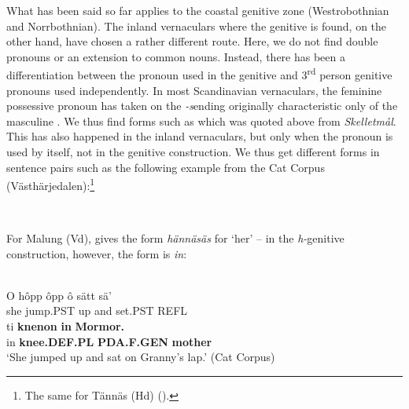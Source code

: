 What has been said so far applies to the coastal genitive zone (Westrobothnian and Norrbothnian). The inland vernaculars where the genitive is found, on the other hand, have chosen a rather different route. Here, we do not find double pronouns or an extension to common nouns. Instead, there has been a differentiation between the pronoun used in the genitive and 3\textsuperscript{rd} person genitive pronouns used independently. In most Scandinavian vernaculars, the feminine possessive pronoun has taken on the\textit{ {}-s}\textstyleLinguisticExample{ }ending originally characteristic only of the masculine . We thus find forms such as  which was quoted above from \textit{Skelletmål}. This has also happened in the inland vernaculars, but only when the pronoun is used by itself, not in the genitive construction. We thus get different forms in sentence pairs such as the following example from the Cat Corpus (Västhärjedalen):\footnote{ The same for Tännäs (Hd) (\citet[22]{Olofsson1999}).}

\ea\label{}
\\

\z 
\z

For Malung (Vd), \citet[2:211]{Levander1925} gives the form \textit{hännäsäs} for ‘her’ – in the \textit{h-}genitive construction, however, the form is \textit{in}: 


\ea\label{}
\\
\gll O  hôpp  ôpp  ô  sätt  sä’  \\
she  jump.PST  up  and  set.PST  REFL  \\
\gll ti  \textbf{knenon} \textbf{in} \textbf{Mormor.}\\
in  \textbf{knee.DEF.PL} \textbf{PDA.F.GEN} \textbf{mother}\\
\glt ‘She jumped up and sat on Granny’s lap.’ (Cat Corpus)
\z

